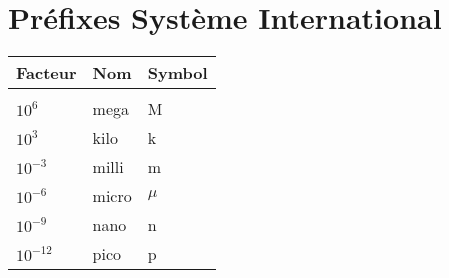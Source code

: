 \section{Préfixes Système International}
\begin{center}
\renewcommand{\arraystretch}{1}
\begin{tabular}{lll}
Facteur    & Nom   & Symbol \\\hline\\[-1em]
$10^{6}$   & mega  & M      \\
$10^3$     & kilo  & k      \\
$10^{-3}$  & milli & m      \\
$10^{-6}$  & micro & $\mu$  \\
$10^{-9}$  & nano  & n      \\
$10^{-12}$ & pico  & p     
\end{tabular}
\end{center}